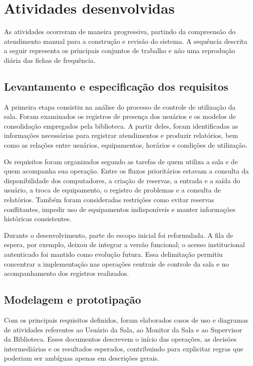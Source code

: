 \section{Atividades desenvolvidas}\label{sec:atividades}

As atividades ocorreram de maneira progressiva, partindo da compreensão do atendimento manual para a construção e revisão do sistema. A sequência descrita a seguir representa os principais conjuntos de trabalho e não uma reprodução diária das fichas de frequência.

\subsection{Levantamento e especificação dos requisitos}

A primeira etapa consistiu na análise do processo de controle de utilização da sala. Foram examinados os registros de presença dos usuários e os modelos de consolidação empregados pela biblioteca. A partir deles, foram identificadas as informações necessárias para registrar atendimentos e produzir relatórios, bem como as relações entre usuários, equipamentos, horários e condições de utilização.

Os requisitos foram organizados segundo as tarefas de quem utiliza a sala e de quem acompanha sua operação. Entre os fluxos prioritários estavam a consulta da disponibilidade dos computadores, a criação de reservas, a entrada e a saída do usuário, a troca de equipamento, o registro de problemas e a consulta de relatórios. Também foram consideradas restrições como evitar reservas conflitantes, impedir uso de equipamentos indisponíveis e manter informações históricas consistentes.

Durante o desenvolvimento, parte do escopo inicial foi reformulada. A fila de espera, por exemplo, deixou de integrar a versão funcional; o acesso institucional autenticado foi mantido como evolução futura. Essa delimitação permitiu concentrar a implementação nas operações centrais de controle da sala e no acompanhamento dos registros realizados.

\subsection{Modelagem e prototipação}

Com os principais requisitos definidos, foram elaborados casos de uso e diagramas de atividades referentes ao Usuário da Sala, ao Monitor da Sala e ao Supervisor da Biblioteca. Esses documentos descrevem o início das operações, as decisões intermediárias e os resultados esperados, contribuindo para explicitar regras que poderiam ser ambíguas apenas em descrições gerais.

